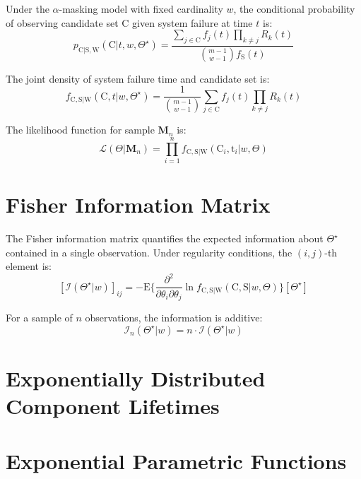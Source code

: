 \documentclass[12pt]{article}
\newcommand{\RV}[1]{\mathrm{#1}}
\newcommand{\Expect}[1]{\mathrm{E}\{#1\}}
\newcommand{\sv}{\RV{S}}           %
\newcommand{\cand}{\RV{C}}         %
\newcommand{\rvcand}{\RV{C}}       %
\newcommand{\ti}{\mathrm{t}}       %
\newcommand{\sysparam}{\Theta}
\newcommand{\tparam}[1]{{#1}^{\star}}  %
\newcommand{\infomatrx}{\mathcal{I}}
\newcommand{\likelihood}{\mathcal{L}}
\newcommand{\mfs}{\mathbf{M}_n}
\newcommand{\pdf}{f}
\newcommand{\pmf}{p}
\newcommand{\srv}{R}
\newcommand{\spdf}{\pdf_{\sv}}
\theoremstyle{definition}
\begin{document}
Under the $\alpha$-masking model with fixed cardinality $w$, the conditional probability of observing candidate set $\cand$ given system failure at time $t$ is:
\begin{equation}
\label{eq:candidate_prob}
\pmf_{\rvcand | \sv, \RV{W}}(\cand | t, w, \tparam{\sysparam}) = \frac{\sum_{j \in \cand} \pdf_j(t) \prod_{k \neq j} \srv_k(t)}{\binom{m-1}{w-1} \spdf(t)}
\end{equation}

The joint density of system failure time and candidate set is:
\begin{equation}
\label{eq:joint_density}
\pdf_{\rvcand, \sv | \RV{W}}(\cand, t | w, \tparam{\sysparam}) = \frac{1}{\binom{m-1}{w-1}} \sum_{j \in \cand} \pdf_j(t) \prod_{k \neq j} \srv_k(t)
\end{equation}

The likelihood function for sample $\mfs$ is:
\begin{equation}
\label{eq:likelihood}
\likelihood(\sysparam | \mfs) = \prod_{i=1}^{n} \pdf_{\rvcand, \sv | \RV{W}}(\cand_i, \ti_i | w, \sysparam)
\end{equation}

\section{Fisher Information Matrix}

The Fisher information matrix quantifies the expected information about $\tparam{\sysparam}$ contained in a single observation. Under regularity conditions, the $(i,j)$-th element is:
\begin{equation}
\label{eq:fisher_info_element}
[\infomatrx(\tparam{\sysparam} | w)]_{ij} = -\Expect{\frac{\partial^2}{\partial \theta_i \partial \theta_j} \ln \pdf_{\rvcand, \sv | \RV{W}}(\rvcand, \sv | w, \sysparam)}[\tparam{\sysparam}]
\end{equation}

For a sample of $n$ observations, the information is additive:
\begin{equation}
\infomatrx_n(\tparam{\sysparam} | w) = n \cdot \infomatrx(\tparam{\sysparam} | w)
\end{equation}

\section{Exponentially Distributed Component Lifetimes}
\label{sec:exponential}

\section{Exponential Parametric Functions}
\end{document}
